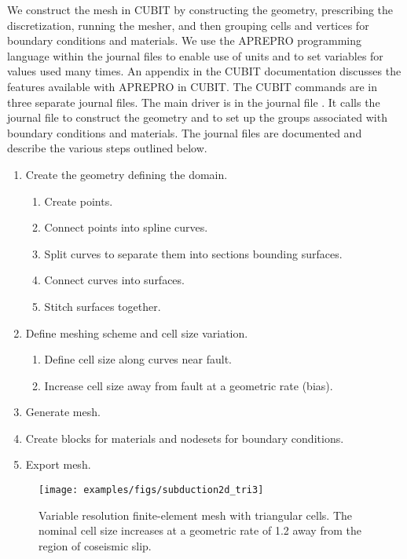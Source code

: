 We construct the mesh in CUBIT by constructing the geometry, prescribing
the discretization, running the mesher, and then grouping cells and
vertices for boundary conditions and materials. We use the APREPRO
programming language within the journal files to enable use of units
and to set variables for values used many times. An appendix in the
CUBIT documentation discusses the features available with APREPRO
in CUBIT. The CUBIT commands are in three separate journal files.
The main driver is in the journal file . It
calls the journal file  to construct the geometry
and  to set up the groups associated with boundary
conditions and materials. The journal files are documented and describe
the various steps outlined below.
\begin{enumerate}
\item Create the geometry defining the domain.
  \begin{enumerate}
  \item Create points.
  \item Connect points into spline curves.
  \item Split curves to separate them into sections bounding surfaces. 
  \item Connect curves into surfaces.
  \item Stitch surfaces together.
  \end{enumerate}
\item Define meshing scheme and cell size variation.
  \begin{enumerate}
  \item Define cell size along curves near fault.
  \item Increase cell size away from fault at a geometric rate (bias).
  \end{enumerate}
\item Generate mesh.
\item Create blocks for materials and nodesets for boundary conditions.
\item Export mesh.
\end{enumerate}

\begin{figure}
  \texttt{[image: examples/figs/subduction2d\_tri3]}
  \caption{Variable resolution finite-element mesh with triangular
    cells. The nominal cell size increases at a geometric rate of 1.2
    away from the region of coseismic slip.}
  \label{fig:example:subduction:2d:mesh}
\end{figure}


